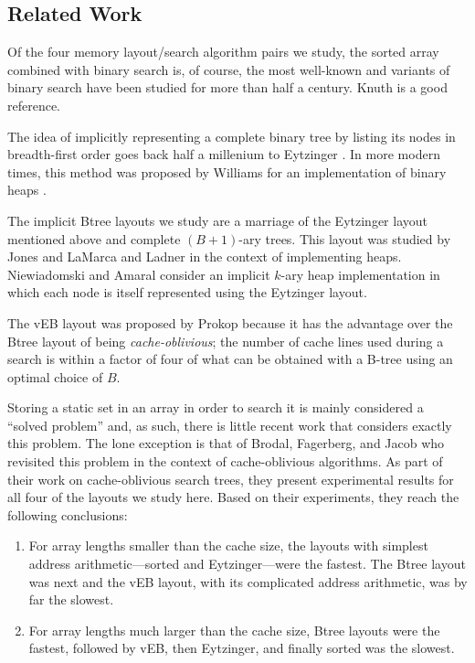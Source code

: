 \documentclass{patmorin}
\begin{document}
\subsection{Related Work}

Of the four memory layout/search algorithm pairs we study, the sorted
array combined with binary search is, of course, the most well-known
and variants of binary search have been studied for more than half a
century. Knuth \cite[Section~6.2.1]{knuth:art} is a good reference.

The idea of implicitly representing a complete binary tree by listing
its nodes in breadth-first order goes back half a millenium to Eytzinger
\cite{eytzinger:thesaurus}. In more modern times, this method was proposed by
Williams for an implementation of binary heaps \cite{williams:algorithm}.

The implicit Btree layouts we study are a marriage of the Eytzinger
layout mentioned above and complete $(B+1)$-ary trees. This layout
was studied by Jones \cite{jones:empirical} and LaMarca and Ladner
\cite{lamarca.ladner:influence} in the context of implementing heaps.
Niewiadomski and Amaral \cite{niewiadomski.amaral:chopping} consider
an implicit $k$-ary heap implementation in which each node is itself
represented using the Eytzinger layout.

The vEB layout was proposed by Prokop
\cite[Section~10.2]{prokop:cache-oblivious} because it has the advantage
over the Btree layout of being \emph{cache-oblivious}; the number of
cache lines used during a search is within a factor of four of what can
be obtained with a B-tree using an optimal choice of $B$.


Storing a static set in an array in order to search it is mainly
considered a ``solved problem'' and, as such, there is little recent
work that considers exactly this problem.  The lone exception is that
of Brodal, Fagerberg, and Jacob \cite{brodal.fagerberg.ea:cache} who
revisited this problem in the context of cache-oblivious algorithms.
As part of their work on cache-oblivious search trees, they present
experimental results for all four of the layouts we study here.  Based on
their experiments, they reach the following conclusions:

\begin{enumerate}

\item For array lengths smaller than the cache size, the layouts with
simplest address arithmetic---sorted and Eytzinger---were the fastest. The
Btree layout was next and the vEB layout, with its complicated address
arithmetic, was by far the slowest.

\item For array lengths much larger than the cache size, Btree layouts
were the fastest, followed by vEB, then Eytzinger, and finally sorted
was the slowest.
\end{enumerate}
\end{document}

